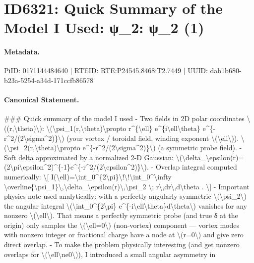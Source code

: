 \section*{ID6321: Quick Summary of the Model I Used: ψ\_2: ψ\_2 (1)}
\paragraph{Metadata.}
PiID: 0171144484640 | RTEID: RTE:P24545.8468:T2.7449 | UUID: dab1b680-b23a-5254-a34d-171ccfb86578

\paragraph{Canonical Statement.}
\#\#\# Quick summary of the model I used - Two fields in 2D polar coordinates \textbackslash{}((r,\textbackslash{}theta)\textbackslash{}): \textbackslash{}(\textbackslash{}psi\_1(r,\textbackslash{}theta)\textbackslash{}propto r\textasciicircum{}\{\textbackslash{}ell\} e\textasciicircum{}\{i\textbackslash{}ell\textbackslash{}theta\} e\textasciicircum{}\{-r\textasciicircum{}2/(2\textbackslash{}sigma\textasciicircum{}2)\}\textbackslash{}) (your vortex / toroidal field, winding exponent \textbackslash{}(\textbackslash{}ell\textbackslash{})). \textbackslash{}(\textbackslash{}psi\_2(r,\textbackslash{}theta)\textbackslash{}propto e\textasciicircum{}\{-r\textasciicircum{}2/(2\textbackslash{}sigma\textasciicircum{}2)\}\textbackslash{}) (a symmetric probe field). - Soft delta approximated by a normalized 2-D Gaussian: \textbackslash{}(\textbackslash{}delta\_\textbackslash{}epsilon(r)=(2\textbackslash{}pi\textbackslash{}epsilon\textasciicircum{}2)\textasciicircum{}\{-1\}e\textasciicircum{}\{-r\textasciicircum{}2/(2\textbackslash{}epsilon\textasciicircum{}2)\}\textbackslash{}). - Overlap integral computed numerically: \textbackslash{}[ I(\textbackslash{}ell)=\textbackslash{}int\_0\textasciicircum{}\{2\textbackslash{}pi\}\textbackslash{}!\textbackslash{}!\textbackslash{}int\_0\textasciicircum{}\textbackslash{}infty \textbackslash{}overline\{\textbackslash{}psi\_1\}\textbackslash{},\textbackslash{}delta\_\textbackslash{}epsilon(r)\textbackslash{},\textbackslash{}psi\_2 \textbackslash{}; r\textbackslash{},dr\textbackslash{},d\textbackslash{}theta . \textbackslash{}] - Important physics note used analytically: with a perfectly angularly symmetric \textbackslash{}(\textbackslash{}psi\_2\textbackslash{}) the angular integral \textbackslash{}(\textbackslash{}int\_0\textasciicircum{}\{2\textbackslash{}pi\} e\textasciicircum{}\{-i\textbackslash{}ell\textbackslash{}theta\}d\textbackslash{}theta\textbackslash{}) vanishes for any nonzero \textbackslash{}(\textbackslash{}ell\textbackslash{}). That means a perfectly symmetric probe (and true δ at the origin) only samples the \textbackslash{}(\textbackslash{}ell=0\textbackslash{}) (non-vortex) component — vortex modes with nonzero integer or fractional charge have a node at \textbackslash{}(r=0\textbackslash{}) and give zero direct overlap. - To make the problem physically interesting (and get nonzero overlaps for \textbackslash{}(\textbackslash{}ell\textbackslash{}ne0\textbackslash{})), I introduced a small angular asymmetry in 